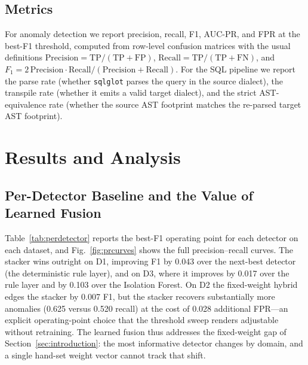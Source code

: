 \documentclass{ieeeaccess}
\begin{document}
\subsection{Metrics}

For anomaly detection we report precision, recall, F1, AUC-PR, and FPR at the
best-F1 threshold, computed from row-level confusion matrices with the usual
definitions $\mathrm{Precision} = \mathrm{TP}/(\mathrm{TP}+\mathrm{FP})$,
$\mathrm{Recall} = \mathrm{TP}/(\mathrm{TP}+\mathrm{FN})$, and
$F_1 = 2\,\mathrm{Precision}\cdot\mathrm{Recall}/(\mathrm{Precision}+\mathrm{Recall})$.
For the SQL pipeline we report the parse rate (whether \texttt{sqlglot} parses the
query in the source dialect), the transpile rate (whether it emits a valid target
dialect), and the strict AST-equivalence rate (whether the source AST footprint
matches the re-parsed target AST footprint).

\section{Results and Analysis}
\label{sec:results}

\subsection{Per-Detector Baseline and the Value of Learned Fusion}

Table~\ref{tab:perdetector} reports the best-F1 operating point for each detector
on each dataset, and Fig.~\ref{fig:prcurves} shows the full precision--recall
curves. The stacker wins outright on D1, improving F1 by 0.043 over the next-best
detector (the deterministic rule layer), and on D3, where it improves by 0.017
over the rule layer and by 0.103 over the Isolation Forest. On D2 the fixed-weight
hybrid edges the stacker by 0.007 F1, but the stacker recovers substantially more
anomalies (0.625 versus 0.520 recall) at the cost of 0.028 additional FPR---an
explicit operating-point choice that the threshold sweep renders adjustable
without retraining. The learned fusion thus addresses the fixed-weight gap of
Section~\ref{sec:introduction}: the most informative detector changes by domain,
and a single hand-set weight vector cannot track that shift.
\end{document}
